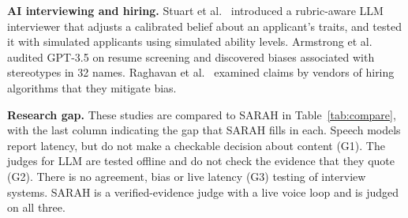 \documentclass[conference]{IEEEtran}
\begin{document}
\textbf{AI interviewing and hiring.} Stuart et al.~\cite{stuart2026} introduced a rubric-aware LLM interviewer that adjusts a calibrated belief about an applicant's traits, and tested it with simulated applicants using simulated ability levels. Armstrong et al.~\cite{armstrong2024} audited GPT-3.5 on resume screening and discovered biases associated with stereotypes in 32 names. Raghavan et al.~\cite{raghavan2020} examined claims by vendors of hiring algorithms that they mitigate bias.

\textbf{Research gap.} These studies are compared to SARAH in Table~\ref{tab:compare}, with the last column indicating the gap that SARAH fills in each. Speech models report latency, but do not make a checkable decision about content (G1). The judges for LLM are tested offline and do not check the evidence that they quote (G2). There is no agreement, bias or live latency (G3) testing of interview systems. SARAH is a verified-evidence judge with a live voice loop and is judged on all three.
\end{document}
